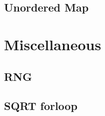 \subsection{Unordered Map}
\raggedbottom
\hrulefill

\section{Miscellaneous}
\subsection{RNG}
\raggedbottom
\hrulefill
\subsection{SQRT forloop}
\raggedbottom
\hrulefill

